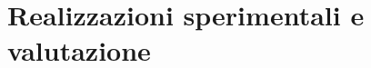 \chapter{Realizzazioni sperimentali e valutazione}
\label{ProveSperimentali}
\thispagestyle{empty}

\vspace{0.5cm}

\noindent 
